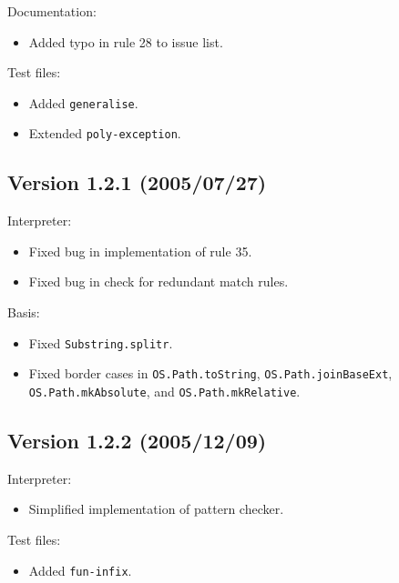 \documentclass[twoside,titlepage]{article}
\begin{document}
\begin{appendix}
Documentation:
\begin{itemize} \setlength{\itemsep}{0em}
\item Added typo in rule 28 to issue list.
\end{itemize}

Test files:
\begin{itemize} \setlength{\itemsep}{0em}
\item Added {\tt generalise}.
\item Extended {\tt poly-exception}.
\end{itemize}

\subsection*{Version 1.2.1 (2005/07/27)}

Interpreter:
\begin{itemize} \setlength{\itemsep}{0em}
\item Fixed bug in implementation of rule 35.
\item Fixed bug in check for redundant match rules.
\end{itemize}

Basis:
\begin{itemize} \setlength{\itemsep}{0em}
\item Fixed {\tt Substring.splitr}.
\item Fixed border cases in {\tt OS.Path.toString}, {\tt OS.Path.joinBaseExt}, {\tt OS.Path.mkAbsolute}, and {\tt OS.Path.mkRelative}.
\end{itemize}

\subsection*{Version 1.2.2 (2005/12/09)}

Interpreter:
\begin{itemize} \setlength{\itemsep}{0em}
\item Simplified implementation of pattern checker.
\end{itemize}

Test files:
\begin{itemize} \setlength{\itemsep}{0em}
\item Added {\tt fun-infix}.
\end{itemize}


\end{appendix}
\end{document}
